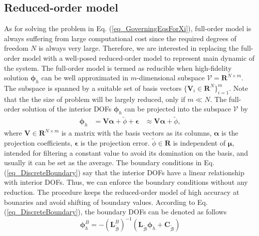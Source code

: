 \documentclass[preprint, 10pt]{elsarticle}
\begin{document}
\subsection{Reduced-order model}
\label{sec_ROM}
As for solving the problem in Eq. (\ref{eq_GoverningEqsForXi}), full-order model is always suffering from large computational cost since the required degrees of freedom $N$ is always very large.  Therefore, we are interested in replacing the full-order model with a well-posed  reduced-order model to represent main dynamic of the system. The full-order model is termed as reducible when high-fidelity solution $\pmb{\phi} _h$ can be well approximated in $m$-dimensional subspace $\mathcal{V}=\mathbf{R}^{N \times m}$. The subspace is spanned by a suitable set of basis vectors $\{\mathbf{V}_i \in \mathbf{R}^{N} \}_{i=1}^m$.  Note that the the size of problem will be largely reduced, only if $m \ll N$. The full-order solution of the interior DOFs $\pmb{\phi} _h$ can be projected into the subspace $\mathcal{V}$ by
\begin{equation}
\begin{aligned}
\pmb{\phi} _h  &   =   \mathbf{V} \pmb{\alpha} + \tilde{\phi} + \pmb{\epsilon}
               &\approx \mathbf{V} \pmb{\alpha} + \tilde{\phi},
\end{aligned}
\label{eq_projection}
\end{equation}
where $\mathbf{V} \in \mathbf{R}^{N\times m}$ is a matrix with the basis vectors as its columns, $\pmb{\alpha}$ is   the projection coefficients, $\pmb{\epsilon}$ is the projection error. $\tilde{\phi} \in \mathbf{R}$ is independent of $\pmb{\mu}$, intended for filtering a constant value to avoid its domination on the basis, and usually it can be set as the average. The boundary conditions in Eq. (\ref{eq_DiscreteBoundary}) say that the interior DOFs have a linear relationship with interior DOFs. Thus, we can enforce the boundary conditions without any reduction. The procedure keeps the reduced-order model of high accuracy at bounaries and avoid shifting of boundary values. According to Eq.(\ref{eq_DiscreteBoundary}), the boundary DOFs can be denoted as follows
\begin{equation}
\pmb{\phi}_h^{B} = -( \mathbf{L}_{\widetilde {\mathcal{B}}}^{B} )^{-1}
\left(
\mathbf{L}_{\widetilde {\mathcal{B}}} \pmb{\phi}_h +
\mathbf{C}_{\widetilde {\mathcal{B}}}
\right)
\label{eq_DerivePhiB}
\end{equation}
\end{document}

